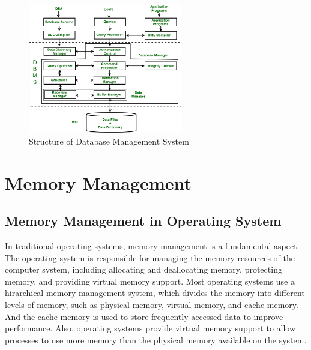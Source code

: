 \documentclass[11pt,a4paper]{article}
\begin{document}
\begin{figure}[h!]
    \centering
    \includegraphics[width=0.6\textwidth]{DBMS.png}
    \caption{Structure of Database Management System}
\end{figure}
\section{Memory Management}

\subsection{Memory Management in Operating System}

In traditional operating systems, memory management is a fundamental aspect. 
The operating system is responsible for managing the memory resources of the computer system, including allocating and deallocating memory, protecting memory, and providing virtual memory support.
Most operating systems use a hirarchical memory management system, which divides the memory into different levels of memory, such as physical memory, virtual memory, and cache memory.
And the cache memory is used to store frequently accessed data to improve performance.
Also, operating systems provide virtual memory support to allow processes to use more memory than the physical memory available on the system. 
\end{document}

